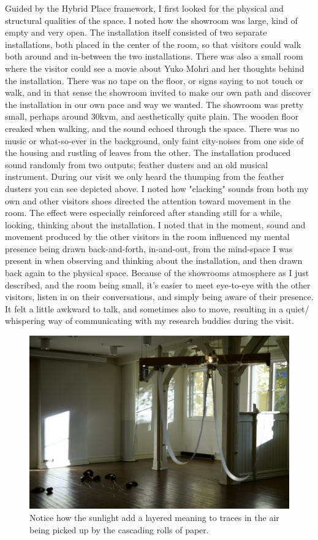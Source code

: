 Guided by the Hybrid Place framework, I first looked for the physical and structural qualities of the space. I noted how the showroom was large, kind of empty and very open. The installation itself consisted of two separate installations, both placed in the center of the room, so that visitors could walk both around and in-between the two installations. There was also a small room where the visitor could see a movie about Yuko Mohri and her thoughts behind the installation. There was no tape on the floor, or signs saying to not touch or walk, and in that sense the showroom invited to make our own path and discover the installation in our own pace and way we wanted. The showroom was pretty small, perhaps around 30kvm, and aesthetically quite plain. The wooden floor creaked when walking, and the sound echoed through the space. There was no music or what-so-ever in the background, only faint city-noises from one side of the housing and rustling of leaves from the other. The installation produced sound randomly from two outputs; feather dusters and an old musical instrument. During our visit we only heard the thumping from the feather dusters you can see depicted above. I noted how "clacking" sounds from both my own and other visitors shoes directed the attention toward movement in the room. The effect were especially reinforced after standing still for a while, looking, thinking about the installation. I noted that in the moment, sound and movement produced by the other visitors in the room influenced my mental presence being drawn back-and-forth, in-and-out, from the mind-space I was present in when observing and thinking about the installation, and then drawn back again to the physical space. Because of the showrooms atmosphere as I just described, and the room being small, it's easier to meet eye-to-eye with the other visitors, listen in on their conversations, and simply being aware of their presence. It felt a little awkward to talk, and sometimes also to move, resulting in a quiet/ whispering way of communicating with my research buddies during the visit.

\begin{figure}[h]
    \includegraphics[width=12cm]{pictures/process/yuko_harmony.jpeg}
    \centering 
    \caption{Notice how the sunlight add a layered meaning to traces in the air being picked up by the cascading rolls of paper.}
\end{figure}

